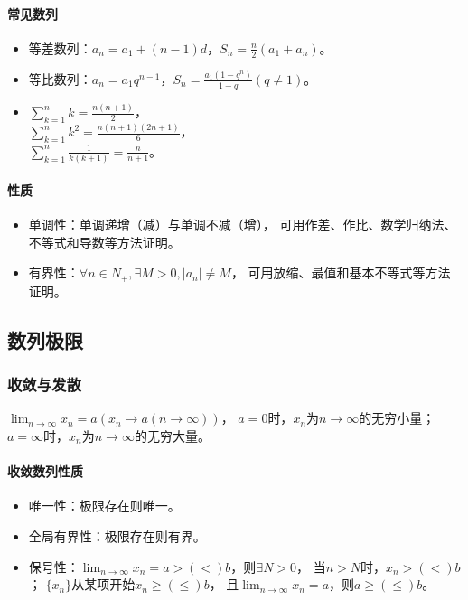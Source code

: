\documentclass[
12pt, %
a4paper, 
oneside, %
headinclude,footinclude, %
]{scrartcl}
\begin{document}
\paragraph{常见数列}
\begin{itemize}
\item 等差数列：$ a_n = a_1 +(n - 1)d $，$ S_n = \frac{n}{2}(a_1 + a_n) $。
\item 等比数列：$ a_n = a_{1}q^{n - 1} $，$ S_n = \frac{a_1(1 - q^n)}{1 - q}(q \neq 1) $。
\item 
$ \sum_{k = 1}^{n} k = \frac{n(n + 1)}{2} $， \\
$ \sum_{k = 1}^{n} k^2 = \frac{n(n + 1)(2n + 1)}{6} $， \\
$ \sum_{k = 1}^{n} \frac{1}{k(k + 1)} = \frac{n}{n + 1} $。 \\
\end{itemize}
\paragraph{性质}
\begin{itemize}
\item 单调性：单调递增（减）与单调不减（增），
可用作差、作比、数学归纳法、不等式和导数等方法证明。
\item 有界性：$ \forall n \in N_+ ,\exists M > 0, |a_n| \neq M $，
可用放缩、最值和基本不等式等方法证明。
\end{itemize}
\subsection{数列极限}
\subsubsection{收敛与发散}
$ \lim_{n \to \infty} x_n = a(x_n \to a(n \to \infty)) $，
$ a = 0 $时，$ x_n $为$ n \to \infty $的无穷小量；
$ a = \infty $时，$ x_n $为$ n \to \infty $的无穷大量。
\paragraph{收敛数列性质}
\begin{itemize}
\item 唯一性：极限存在则唯一。
\item 全局有界性：极限存在则有界。
\item 保号性：$ \lim_{n \to \infty} x_n = a >(<) b $，则$ \exists N > 0 $，
当$ n > N $时，$ x_n >(<) b $； $ \{x_n\} $从某项开始$ x_n \geq(\leq) b $，
且$ \lim_{n \to \infty} x_n = a $，则$ a \geq(\leq) b $。
\end{itemize}
\end{document}
